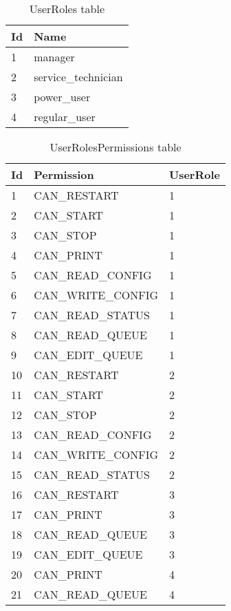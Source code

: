 \documentclass[12pt]{article}
\begin{document}
\begin{table}[H]
\centering
\begin{tabular}{|l|l|}
\hline
Id & Name \\
\hline
1 & manager \\
\hline
2 & service\_technician \\
\hline
3 & power\_user \\
\hline
4 & regular\_user \\
\hline
\end{tabular}
\caption{UserRoles table}
\label{userroles-table}
\end{table}

\begin{table}[H]
\centering
\begin{tabular}{|l|l|l|}
\hline
Id & Permission & UserRole \\
\hline
1 & CAN\_RESTART & 1 \\
\hline
2 & CAN\_START & 1 \\
\hline
3 & CAN\_STOP & 1 \\
\hline
4 & CAN\_PRINT & 1 \\
\hline
5 & CAN\_READ\_CONFIG & 1 \\
\hline
6 & CAN\_WRITE\_CONFIG & 1 \\
\hline
7 & CAN\_READ\_STATUS & 1 \\
\hline
8 & CAN\_READ\_QUEUE & 1 \\
\hline
9 & CAN\_EDIT\_QUEUE & 1 \\
\hline
10 & CAN\_RESTART & 2 \\
\hline
11 & CAN\_START & 2 \\
\hline
12 & CAN\_STOP & 2 \\
\hline
13 & CAN\_READ\_CONFIG & 2 \\
\hline
14 & CAN\_WRITE\_CONFIG & 2 \\
\hline
15 & CAN\_READ\_STATUS & 2 \\
\hline
16 & CAN\_RESTART & 3 \\
\hline
17 & CAN\_PRINT & 3 \\
\hline
18 & CAN\_READ\_QUEUE & 3 \\
\hline
19 & CAN\_EDIT\_QUEUE & 3 \\
\hline
20 & CAN\_PRINT & 4 \\
\hline
21 & CAN\_READ\_QUEUE & 4 \\
\hline
\end{tabular}
\caption{UserRolesPermissions table}
\label{userrolepermissions-table}
\end{table}
\end{document}
